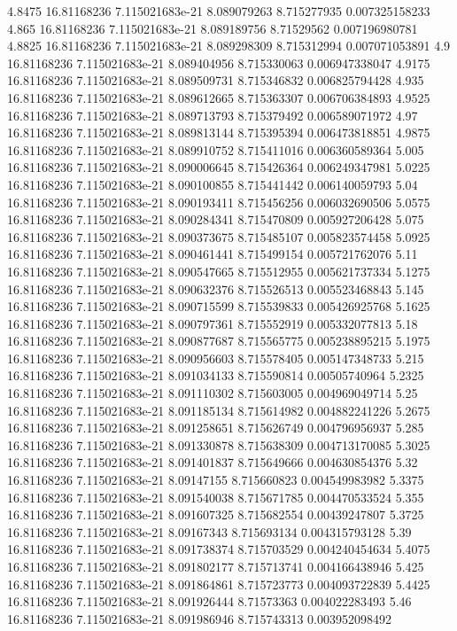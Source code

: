 {4.8475 16.81168236 7.115021683e-21 8.089079263 8.715277935 0.007325158233
4.865 16.81168236 7.115021683e-21 8.089189756 8.71529562 0.007196980781
4.8825 16.81168236 7.115021683e-21 8.089298309 8.715312994 0.007071053891
4.9 16.81168236 7.115021683e-21 8.089404956 8.715330063 0.006947338047
4.9175 16.81168236 7.115021683e-21 8.089509731 8.715346832 0.006825794428
4.935 16.81168236 7.115021683e-21 8.089612665 8.715363307 0.006706384893
4.9525 16.81168236 7.115021683e-21 8.089713793 8.715379492 0.006589071972
4.97 16.81168236 7.115021683e-21 8.089813144 8.715395394 0.006473818851
4.9875 16.81168236 7.115021683e-21 8.089910752 8.715411016 0.006360589364
5.005 16.81168236 7.115021683e-21 8.090006645 8.715426364 0.006249347981
5.0225 16.81168236 7.115021683e-21 8.090100855 8.715441442 0.006140059793
5.04 16.81168236 7.115021683e-21 8.090193411 8.715456256 0.006032690506
5.0575 16.81168236 7.115021683e-21 8.090284341 8.715470809 0.005927206428
5.075 16.81168236 7.115021683e-21 8.090373675 8.715485107 0.005823574458
5.0925 16.81168236 7.115021683e-21 8.090461441 8.715499154 0.005721762076
5.11 16.81168236 7.115021683e-21 8.090547665 8.715512955 0.005621737334
5.1275 16.81168236 7.115021683e-21 8.090632376 8.715526513 0.005523468843
5.145 16.81168236 7.115021683e-21 8.090715599 8.715539833 0.005426925768
5.1625 16.81168236 7.115021683e-21 8.090797361 8.715552919 0.005332077813
5.18 16.81168236 7.115021683e-21 8.090877687 8.715565775 0.005238895215
5.1975 16.81168236 7.115021683e-21 8.090956603 8.715578405 0.005147348733
5.215 16.81168236 7.115021683e-21 8.091034133 8.715590814 0.00505740964
5.2325 16.81168236 7.115021683e-21 8.091110302 8.715603005 0.004969049714
5.25 16.81168236 7.115021683e-21 8.091185134 8.715614982 0.004882241226
5.2675 16.81168236 7.115021683e-21 8.091258651 8.715626749 0.004796956937
5.285 16.81168236 7.115021683e-21 8.091330878 8.715638309 0.004713170085
5.3025 16.81168236 7.115021683e-21 8.091401837 8.715649666 0.004630854376
5.32 16.81168236 7.115021683e-21 8.09147155 8.715660823 0.004549983982
5.3375 16.81168236 7.115021683e-21 8.091540038 8.715671785 0.004470533524
5.355 16.81168236 7.115021683e-21 8.091607325 8.715682554 0.00439247807
5.3725 16.81168236 7.115021683e-21 8.09167343 8.715693134 0.004315793128
5.39 16.81168236 7.115021683e-21 8.091738374 8.715703529 0.004240454634
5.4075 16.81168236 7.115021683e-21 8.091802177 8.715713741 0.004166438946
5.425 16.81168236 7.115021683e-21 8.091864861 8.715723773 0.004093722839
5.4425 16.81168236 7.115021683e-21 8.091926444 8.71573363 0.004022283493
5.46 16.81168236 7.115021683e-21 8.091986946 8.715743313 0.003952098492
}
